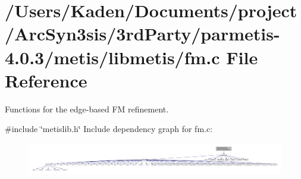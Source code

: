 \hypertarget{a00197}{}\section{/\+Users/\+Kaden/\+Documents/project/\+Arc\+Syn3sis/3rd\+Party/parmetis-\/4.0.3/metis/libmetis/fm.c File Reference}
\label{a00197}


Functions for the edge-\/based FM refinement.  


{\ttfamily \#include \char`\"{}metislib.\+h\char`\"{}}\newline
Include dependency graph for fm.\+c\+:\nopagebreak
\begin{figure}[H]
\begin{center}
\leavevmode
\includegraphics[width=350pt]{a00198}
\end{center}
\end{figure}
